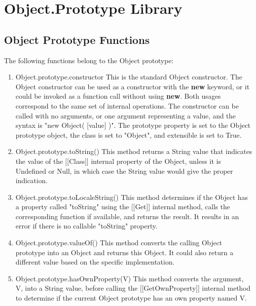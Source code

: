 \documentclass[a4paper,11pt,twoside]{report}
\begin{document}
\chapter{Object.Prototype Library}
\section{Object Prototype Functions}
The following functions belong to the Object prototype: 
\begin{enumerate}
\item Object.prototype.constructor \newline
This is the standard Object constructor. The Object constructor can be used as a constructor with the \textbf{new} keyword, or it could be invoked as a function call without using \textbf{new}. Both usages correspond to the same set of internal operations. The constructor can be called with no arguments, or one argument representing a value, and the syntax is "new Object( [value] )".
The prototype property is set to the Object prototype object, the class is set to "Object", and extensible is set to True.

\item Object.prototype.toString() \newline
This method returns a String value that indicates the value of the [[Class]] internal property of the Object, unless it is Undefined or Null, in which case the String value would give the proper indication.

\item Object.prototype.toLocaleString() \newline
This method determines if the Object has a property called "toString" using the [[Get]] internal method, calls the corresponding function if available, and returns the result. It results in an error if there is no callable "toString" property.

\item Object.prototype.valueOf() \newline
This method converts the calling Object prototype into an Object and returns this Object. It could also return a different value based on the specific implementation.

\item Object.prototype.hasOwnProperty(V) \newline
This method converts the argument, V, into a String value, before calling the [[GetOwnProperty]] internal method to determine if the current Object prototype has an own property named V.


\end{enumerate}
\end{document}
